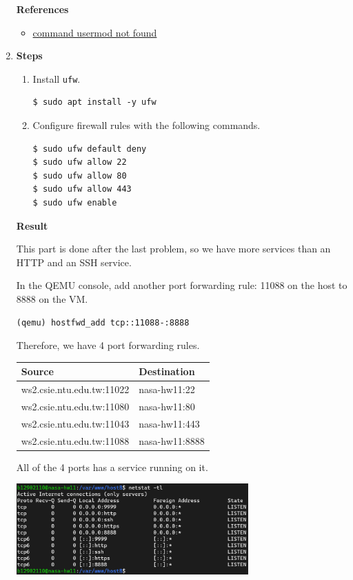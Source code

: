\documentclass[12pt, a4paper]{article}
\begin{document}
\begin{enumerate}[resume]
    \textbf{References}
    \begin{itemize}
      \item \href{https://www.linuxquestions.org/questions/linux-newbie-8/command-usermod-not-found-385901/}{command usermod not found}
    \end{itemize}

    \item \textbf{Steps}
    \begin{enumerate}[label=(\arabic*)]
      \item Install \verb|ufw|.
      \begin{Verbatim}[frame=single]
$ sudo apt install -y ufw
      \end{Verbatim}
      \item Configure firewall rules with the following commands.
      \begin{Verbatim}[frame=single]
$ sudo ufw default deny
$ sudo ufw allow 22
$ sudo ufw allow 80
$ sudo ufw allow 443
$ sudo ufw enable
      \end{Verbatim}
    \end{enumerate}

    \textbf{Result}

    This part is done after the last problem, so we have more services than an HTTP
    and an SSH service.

    In the QEMU console, add another port forwarding rule: 11088 on the host to
    8888 on the VM.
    \begin{Verbatim}[frame=single]
(qemu) hostfwd_add tcp::11088-:8888
    \end{Verbatim}

    Therefore, we have 4 port forwarding rules.

    \begin{tabular}{|ll|}
      \hline
      \textbf{Source} & \textbf{Destination} \\\hline
      ws2.csie.ntu.edu.tw:11022 & nasa-hw11:22 \\
      ws2.csie.ntu.edu.tw:11080 & nasa-hw11:80 \\
      ws2.csie.ntu.edu.tw:11043 & nasa-hw11:443 \\
      ws2.csie.ntu.edu.tw:11088 & nasa-hw11:8888 \\
      \hline
    \end{tabular}

    All of the 4 ports has a service running on it.

    \includegraphics[width=0.7\textwidth]{7_netstat.png}


\end{enumerate}
\end{document}
